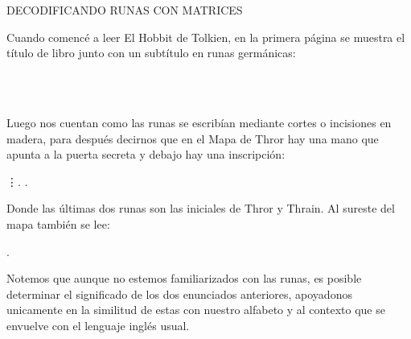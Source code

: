 \documentclass[12pt,a4paper]{article}
\begin{document}
\begin{center}
{\LARGE{DECODIFICANDO RUNAS CON MATRICES}}
\vspace{1cm}
\end{center}
Cuando comencé a leer El Hobbit de Tolkien, en la primera p\'agina se muestra el t\'itulo de libro junto con un subt\'itulo en runas germ\'anicas:
\begin{center}
\vspace{0.5cm}
{\LARGE{  }}\\
{\large{}}\\
{\large{   }}
\end{center}
\vspace{0.5cm}

Luego nos cuentan como las runas se escrib\'ian mediante cortes o incisiones en madera, para despu\'es decirnos que en el Mapa de Thror hay una mano que apunta a la puerta secreta y debajo hay una inscripci\'on:
\vspace{0.2cm}
\begin{center}
               \vdots  \textara{\th}. \textara{\th}.
\end{center}
\vspace{0.2cm}

Donde las \'ultimas dos runas son las iniciales de Thror y Thrain. Al sureste del mapa tambi\'en se lee:
\vspace{0.4cm}

                                              .
\vspace{0.4cm}

Notemos que aunque no estemos familiarizados con las runas, es posible determinar el significado de los dos enunciados anteriores, apoyadonos unicamente en la similitud de estas con nuestro alfabeto y al contexto que se envuelve con el lenguaje ingl\'es usual.
\end{document}
